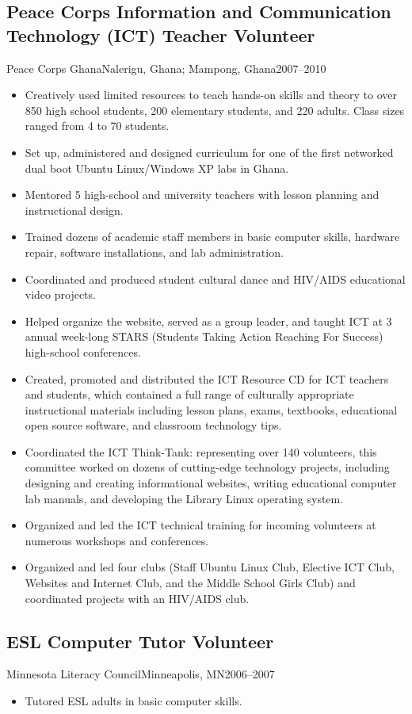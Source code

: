 \documentclass[../main.tex]{subfiles}
\begin{document}
	\subsection{Peace Corps Information and Communication Technology (ICT) Teacher Volunteer}{Peace Corps Ghana}{Nalerigu, Ghana; Mampong, Ghana}{2007--2010}
	\begin{itemize}
		\item{Creatively used limited resources to teach hands-on skills and theory to over 850 high school students, 200 elementary students, and 220 adults. Class sizes ranged from 4 to 70 students.}
		\item{Set up, administered and designed curriculum for one of the first networked dual boot Ubuntu Linux/Windows XP labs in Ghana. }
		\item{Mentored 5 high-school and university teachers with lesson planning and instructional design. }
		\item{Trained dozens of academic staff members in basic computer skills, hardware repair, software installations, and lab administration.}
		\item{Coordinated and produced student cultural dance and HIV/AIDS educational video projects.}
		\item{Helped organize the website, served as a group leader, and taught ICT at 3 annual week-long STARS (Students Taking Action Reaching For Success) high-school conferences.}
		\item{Created, promoted and distributed the ICT Resource CD for ICT teachers and students, which contained a full range of culturally appropriate instructional materials including lesson plans, exams, textbooks, educational open source software, and classroom technology tips.}
		\item{Coordinated the ICT Think-Tank: representing over 140 volunteers, this committee worked on dozens of cutting-edge technology projects, including designing and creating informational websites, writing educational computer lab manuals, and developing the Library Linux operating system. }
		\item{Organized and led the ICT technical training for incoming volunteers at numerous workshops and conferences.}
		\item{Organized and led four clubs (Staff Ubuntu Linux Club, Elective ICT Club, Websites and Internet Club, and the Middle School Girls Club) and coordinated projects with an HIV/AIDS club. }
	\end{itemize}

	\subsection{ESL Computer Tutor Volunteer}{Minnesota Literacy Council}{Minneapolis, MN}{2006--2007}
	\begin{itemize}
		\item{Tutored ESL adults in basic computer skills.}
	\end{itemize}
\end{document}

